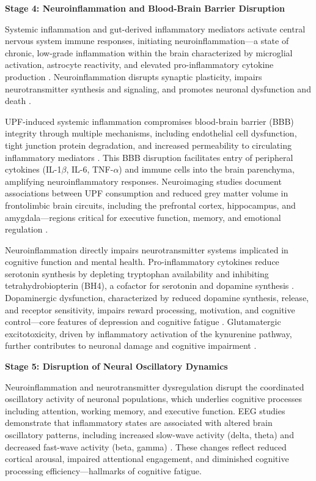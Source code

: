 \documentclass[journal,twoside,10pt]{IEEEtran}
\begin{document}
\textbf{Stage 4: Neuroinflammation and Blood-Brain Barrier Disruption}

Systemic inflammation and gut-derived inflammatory mediators activate central nervous system immune responses, initiating neuroinflammation---a state of chronic, low-grade inflammation within the brain characterized by microglial activation, astrocyte reactivity, and elevated pro-inflammatory cytokine production \cite{ref17,ref54}. Neuroinflammation disrupts synaptic plasticity, impairs neurotransmitter synthesis and signaling, and promotes neuronal dysfunction and death \cite{ref13,ref17,ref43}.

UPF-induced systemic inflammation compromises blood-brain barrier (BBB) integrity through multiple mechanisms, including endothelial cell dysfunction, tight junction protein degradation, and increased permeability to circulating inflammatory mediators \cite{ref13,ref17}. This BBB disruption facilitates entry of peripheral cytokines (IL-1$\beta$, IL-6, TNF-$\alpha$) and immune cells into the brain parenchyma, amplifying neuroinflammatory responses. Neuroimaging studies document associations between UPF consumption and reduced grey matter volume in frontolimbic brain circuits, including the prefrontal cortex, hippocampus, and amygdala---regions critical for executive function, memory, and emotional regulation \cite{ref2,ref13}.

Neuroinflammation directly impairs neurotransmitter systems implicated in cognitive function and mental health. Pro-inflammatory cytokines reduce serotonin synthesis by depleting tryptophan availability and inhibiting tetrahydrobiopterin (BH4), a cofactor for serotonin and dopamine synthesis \cite{ref3,ref9}. Dopaminergic dysfunction, characterized by reduced dopamine synthesis, release, and receptor sensitivity, impairs reward processing, motivation, and cognitive control---core features of depression and cognitive fatigue \cite{ref3,ref4}. Glutamatergic excitotoxicity, driven by inflammatory activation of the kynurenine pathway, further contributes to neuronal damage and cognitive impairment \cite{ref9,ref17}.

\textbf{Stage 5: Disruption of Neural Oscillatory Dynamics}

Neuroinflammation and neurotransmitter dysregulation disrupt the coordinated oscillatory activity of neuronal populations, which underlies cognitive processes including attention, working memory, and executive function. EEG studies demonstrate that inflammatory states are associated with altered brain oscillatory patterns, including increased slow-wave activity (delta, theta) and decreased fast-wave activity (beta, gamma) \cite{ref17,ref54}. These changes reflect reduced cortical arousal, impaired attentional engagement, and diminished cognitive processing efficiency---hallmarks of cognitive fatigue.
\end{document}
